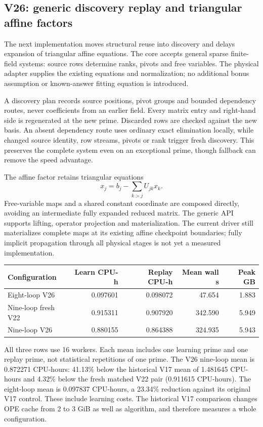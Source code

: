 \documentclass[11pt]{article}
\begin{document}
\subsection{V26: generic discovery replay and triangular affine factors}
The next implementation moves structural reuse into discovery and delays
expansion of triangular affine equations. The core accepts general sparse
finite-field systems: source rows determine ranks, pivots and free variables.
The physical adapter supplies the existing equations and normalization;
no additional bonus assumption or known-answer fitting equation is introduced.

A discovery plan records source positions, pivot groups and bounded
dependency routes, never coefficients from an earlier field. Every matrix
entry and right-hand side is regenerated at the new prime. Discarded rows
are checked against the new basis. An absent dependency route uses ordinary
exact elimination locally, while changed source identity, row streams,
pivots or rank trigger fresh discovery. This preserves the complete system
even on an exceptional prime, though fallback can remove the speed advantage.

The affine factor retains triangular equations
\[
 x_j=b_j-\sum_{k>j}U_{jk}x_k.
\]
Free-variable maps and a shared constant coordinate are composed directly,
avoiding an intermediate fully expanded reduced matrix. The generic API
supports lifting, operator projection and materialization. The current
driver still materializes complete maps at its existing affine checkpoint
boundaries; fully implicit propagation through all physical stages is not
yet a measured implementation.

\begin{center}
\begin{tabular}{lrrrr}\toprule
Configuration & Learn CPU-h & Replay CPU-h & Mean wall s & Peak GB\\\midrule
Eight-loop V26 & 0.097601 & 0.098072 & 47.654 & 1.883\\
Nine-loop fresh V22 & 0.915311 & 0.907920 & 342.590 & 5.949\\
Nine-loop V26 & 0.880155 & 0.864388 & 324.935 & 5.943\\
\bottomrule
\end{tabular}
\end{center}
All three rows use 16 workers. Each mean includes one learning prime and
one replay prime, not statistical repetitions of one prime. The V26
nine-loop mean is 0.872271 CPU-hours: 41.13\% below the historical V17
mean of 1.481645 CPU-hours and 4.32\% below the fresh matched V22 pair
(0.911615 CPU-hours). The eight-loop mean is 0.097837 CPU-hours, a 23.34\%
reduction against its original V17 control. These include learning costs.
The historical V17 comparison changes OPE cache from 2 to 3 GiB as well as
algorithm, and therefore measures a whole configuration.
\end{document}
